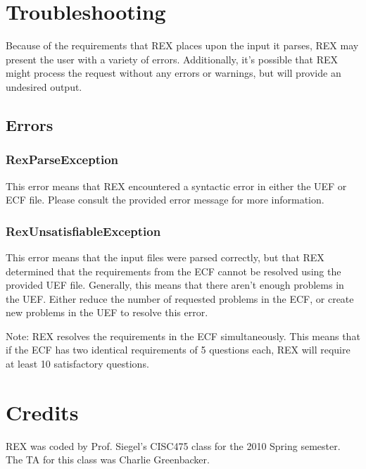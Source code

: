 \documentclass{article}
\begin{document}
\section{Troubleshooting}
Because of the requirements that REX places upon the input it parses,
REX may present the user with a variety of errors. Additionally, it's
possible that REX might process the request without any errors or warnings,
but will provide an undesired output.

\subsection{Errors}
\subsubsection{RexParseException}
This error means that REX encountered a syntactic error in either the
UEF or ECF file. Please consult the provided error message for more
information.

\subsubsection{RexUnsatisfiableException}
This error means that the input files were parsed correctly, but that
REX determined that the requirements from the ECF cannot be resolved
using the provided UEF file. Generally, this means that there aren't
enough problems in the UEF. Either reduce the number of requested
problems in the ECF, or create new problems in the UEF to resolve
this error.

Note: REX resolves the requirements in the ECF simultaneously. This means
that if the ECF has two identical requirements of 5 questions each, REX
will require at least 10 satisfactory questions.

\section{Credits}
REX was coded by Prof. Siegel's CISC475 class for the 2010 Spring
semester. The TA for this class was Charlie Greenbacker.
\end{document}
